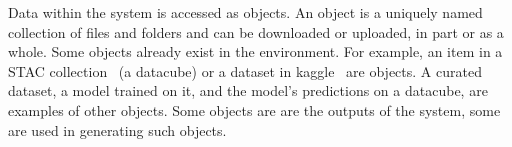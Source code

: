 Data within the system is accessed as objects. An object is a uniquely named collection of files and folders and can be downloaded or uploaded, in part or as a whole. Some objects already exist in the environment. For example, an item in a STAC collection~\cite{stac_intro_tutorial} (a datacube) or a dataset in kaggle~\cite{chen2019-AIRD-dataset} are objects. A curated dataset, a model trained on it, and the model's predictions on a datacube, are examples of other objects. Some objects are are the outputs of the system, some are used in generating such objects.